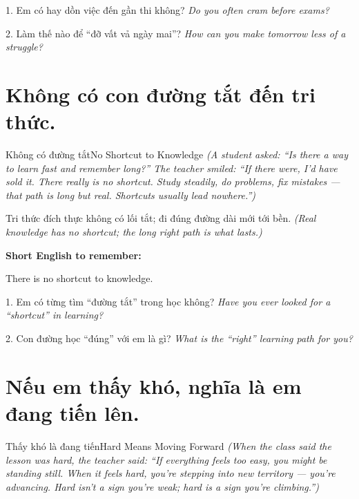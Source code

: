\begin{tuhocnhanh}
1. Em có hay dồn việc đến gần thi không? \textit{Do you often cram before exams?}

2. Làm thế nào để ``đỡ vất vả ngày mai''? \textit{How can you make tomorrow less of a struggle?}
\end{tuhocnhanh}
\ngancach

\section{Không có con đường tắt đến tri thức.}
\begin{truyen}{Không có đường tắt}{No Shortcut to Knowledge}
\textit{(A student asked: ``Is there a way to learn fast and remember long?'' The teacher smiled: ``If there were, I'd have sold it. There really is no shortcut. Study steadily, do problems, fix mistakes — that path is long but real. Shortcuts usually lead nowhere.'')}
\end{truyen}

\begin{baihoc}
Tri thức đích thực không có lối tắt; đi đúng đường dài mới tới bền.
\textit{(Real knowledge has no shortcut; the long right path is what lasts.)}
\end{baihoc}

\begin{ghinhoanh}
\textbf{Short English to remember:}

There is no shortcut to knowledge.

\end{ghinhoanh}

\begin{tuhocnhanh}
1. Em có từng tìm ``đường tắt'' trong học không? \textit{Have you ever looked for a ``shortcut'' in learning?}

2. Con đường học ``đúng'' với em là gì? \textit{What is the ``right'' learning path for you?}
\end{tuhocnhanh}
\ngancach

\section{Nếu em thấy khó, nghĩa là em đang tiến lên.}
\begin{truyen}{Thấy khó là đang tiến}{Hard Means Moving Forward}
\textit{(When the class said the lesson was hard, the teacher said: ``If everything feels too easy, you might be standing still. When it feels hard, you're stepping into new territory — you're advancing. Hard isn't a sign you're weak; hard is a sign you're climbing.'')}
\end{truyen}

